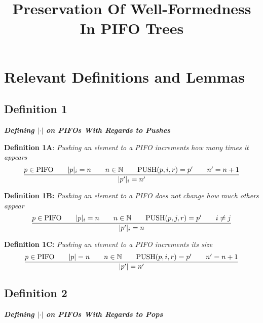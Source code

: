 \documentclass{article}
\begin{document}
\title{Preservation Of Well-Formedness In PIFO Trees}

\maketitle

\section{Relevant Definitions and Lemmas}

\subsection{Definition 1}

\noindent \textbf{\textit{Defining $|\cdot|$ on PIFOs With Regards to Pushes}}

\hfill \break 

\noindent \textbf{Definition 1A}: \textit{Pushing an element to a PIFO increments how many times it appears}
 $$\frac{p \in \text{PIFO}  \hspace{0.7cm} |p|_i = n \hspace{0.7cm} n \in \mathbb{N} \hspace{0.7cm} \text{PUSH}(p, i, r) = p' \hspace{0.7cm} n' = n+1}{|p'|_i = n'}$$

\noindent \textbf{Definition 1B:} \textit{Pushing an element to a PIFO does not change how much others appear}
$$\frac{p \in \text{PIFO}  \hspace{0.7cm} |p|_i = n \hspace{0.7cm} n \in \mathbb{N} \hspace{0.7cm} \text{PUSH}(p, j, r) = p' \hspace{0.7cm} i \neq j}{|p'|_i = n}$$

\noindent \textbf{Definition 1C:} \textit{Pushing an element to a PIFO increments its size}
$$\frac{p \in \text{PIFO}  \hspace{0.7cm} |p| = n \hspace{0.7cm} n \in \mathbb{N} \hspace{0.7cm} \text{PUSH}(p, i, r) = p' \hspace{0.7cm} n' = n+1}{|p'| = n'}$$\newline

\subsection{Definition 2}
\noindent \textbf{\textit{Defining $|\cdot|$ on PIFOs With Regards to Pops}}
\end{document}
